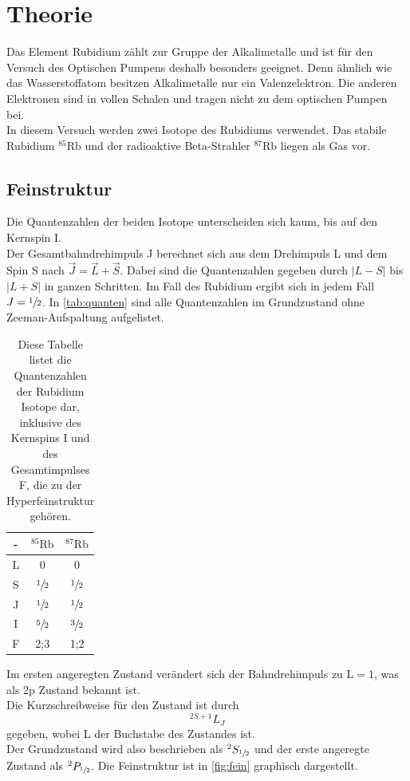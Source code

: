 \section{Theorie}
\label{sec:theorie}

Das Element Rubidium zählt zur Gruppe der Alkalimetalle und ist für den Versuch des Optischen Pumpens deshalb besonders geeignet.
Denn ähnlich wie das Wasserstoffatom besitzen Alkalimetalle nur ein Valenzelektron.
Die anderen Elektronen sind in vollen Schalen und tragen nicht zu dem optischen Pumpen bei.\\
In diesem Versuch werden zwei Isotope des Rubidiums verwendet.
Das stabile Rubidium $^{85}\text{Rb}$ und der radioaktive Beta-Strahler $^{87}\text{Rb}$ liegen als Gas vor.

\subsection{Feinstruktur}
Die Quantenzahlen der beiden Isotope unterscheiden sich kaum, bis auf den Kernspin I.\\
Der Gesamtbahndrehimpuls J berechnet sich aus dem Drehimpuls L und dem Spin S nach $\vec{J} = \vec{L} + \vec{S}$.
Dabei sind die Quantenzahlen gegeben durch $|L-S|$ bis $|L+S|$ in ganzen Schritten.
Im Fall des Rubidium ergibt sich in jedem Fall $J=\sfrac{1}{2}$.
In \autoref{tab:quanten} sind alle Quantenzahlen im Grundzustand ohne Zeeman-Aufspaltung aufgelistet.

\begin{table}[H]
    \centering
    \begin{tabular}{c c c}
        \toprule
        - & $^{85}\text{Rb}$ & $^{87}\text{Rb}$\\
        \midrule
        L & 0 & 0\\
        S & $\sfrac{1}{2}$ & $\sfrac{1}{2}$\\
        J & $\sfrac{1}{2}$ & $\sfrac{1}{2}$\\
        I & $\sfrac{5}{2}$ & $\sfrac{3}{2}$\\
        F & 2;3 & 1;2\\
        \bottomrule
    \end{tabular}
    \caption{Diese Tabelle listet die Quantenzahlen der Rubidium Isotope dar, inklusive des Kernspins I und des Gesamtimpulses F, die zu der Hyperfeinstruktur gehören.}
    \label{tab:quanten}
\end{table}

Im ersten angeregten Zustand verändert sich der Bahndrehimpuls zu $\text{L}=1$, was als 2p Zustand bekannt ist.\\
Die Kurzschreibweise für den Zustand ist durch
\begin{equation}
    ^{2S+1}L_J
\end{equation}
gegeben, wobei L der Buchstabe des Zustandes ist.\\
Der Grundzustand wird also beschrieben als $^2S_{\sfrac{1}{2}}$ und der erste angeregte Zustand als $^2P_{\sfrac{1}{2}}$.
Die Feinstruktur ist in \autoref{fig:fein} graphisch dargestellt.

